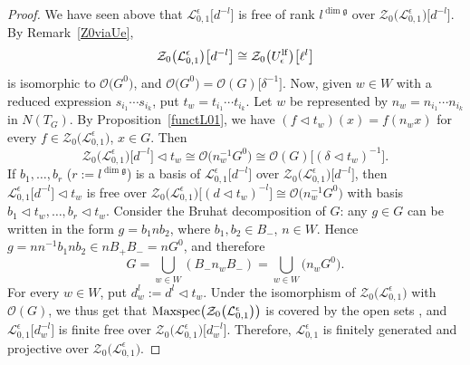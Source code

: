 \documentclass[10pt,a4paper]{amsart}
\numberwithin{equation}{section}
\theoremstyle{definition}
\newcommand{\e}{\epsilon}
\newcommand{\Ll}{{\mathcal L}}
\newcommand{\Oo}{{\mathcal O}}
\begin{document}
\begin{proof}
We have seen above that $\Ll_{0,1}^\e\big[d^{-l}\big]$ is free of rank $l^{\dim \mathfrak{g}}$ over $\mathcal{Z}_0\bigl(\Ll_{0,1}^\e\bigr)\big[d^{-l}\big]$. By Remark~\ref{Z0viaUe}, \[\mathcal{Z}_0\bigl(\Ll_{0,1}^\e\bigr)\big[d^{-l}\big]\cong \mathcal{Z}_0\big(U_\e^{\rm lf}\big)\big[\ell^l\big]\] is isomorphic to $\Oo\big(G^0\big)$, and $\Oo\big(G^0\big) = \Oo(G)\big[\delta^{-1}\big]$. Now, given $w\in W$ with a reduced expression $s_{i_1}\cdots s_{i_k}$, put $t_w = t_{i_1}\cdots t_{i_k}$. Let $w$ be represented by $n_w = n_{i_1}\cdots n_{i_k}$ in $N(T_G)$. By Proposition~\ref{functL01}, we have $(f\lhd t_w)(x) = f(n_wx)$ for every $f\in \mathcal{Z}_0\bigl(\Ll_{0,1}^\e\bigr)$, $x\in G$. Then
\begin{equation}\label{BruhatactionX}
\mathcal{Z}_0\bigl(\Ll_{0,1}^\e\bigr)\big[d^{-l}\big]\lhd t_w \cong \Oo\big(n_{w}^{-1}G^0\big) \cong \Oo(G)\big[(\delta\lhd t_w)^{-1}\big].
\end{equation}
If $b_1,\dots,b_r$ \big($r:= l^{\dim \mathfrak{g}}$\big) is a basis of $\Ll_{0,1}^\e\big[d^{-l}\big]$ over $\mathcal{Z}_0\bigl(\Ll_{0,1}^\e\bigr)\big[d^{-l}\big]$, then $\Ll_{0,1}^\e\big[d^{-l}\big]\lhd t_w$ is free over $\mathcal{Z}_0\bigl(\Ll_{0,1}^\e\bigr)\big[(d\lhd t_w)^{-l}\big]\cong \Oo\big(n_{w}^{-1}G^0\big)$ with basis $b_1\lhd t_w,\dots,b_r\lhd t_w$. Consider the Bruhat decomposition of $G$: any $g\in G$ can be written in the form $g=b_1n b_2$, where $b_1,b_2\in B_-$, $n\in W$. Hence $g = nn^{-1}b_1nb_2\in nB_+B_- = nG^0$, and therefore%
\[G = \bigcup_{w\in W} (B_- n_w B_- )= \bigcup_{w\in W} \big(n_w G^0\big).\]
For every $w\in W$, put $d^l_w := d^{l}\lhd t_w$.
Under the isomorphism of $\mathcal{Z}_0\bigl(\Ll_{0,1}^\e\bigr)$ with $\Oo(G)$, we thus get that ${\rm Maxspec}\bigl(\mathcal{Z}_0\bigl(\Ll_{0,1}^\e\bigr)\bigr)$ is covered by the open sets , and $\Ll_{0,1}^\e\big[d_w^{-l}\big]$ is finite free over $\mathcal{Z}_0\bigl(\Ll_{0,1}^\e\bigr)\big[d_w^{-l}\big]$. Therefore, $\Ll_{0,1}^\e$ is finitely generated and projective over $\mathcal{Z}_0\bigl(\Ll_{0,1}^\e\bigr)$.


\end{proof}
\end{document}
